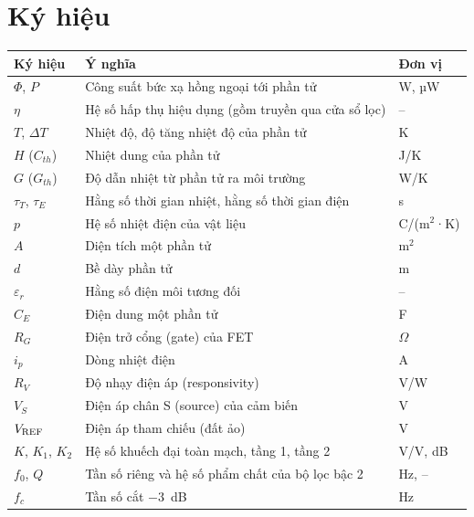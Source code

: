 \section*{Ký hiệu}
\begin{longtable}{@{}p{2.6cm}p{9.6cm}p{2.4cm}@{}}
\toprule
\textbf{Ký hiệu} & \textbf{Ý nghĩa} & \textbf{Đơn vị} \\ \midrule
\endhead
$\Phi$, $P$       & Công suất bức xạ hồng ngoại tới phần tử & W, µW \\
$\eta$            & Hệ số hấp thụ hiệu dụng (gồm truyền qua cửa sổ lọc) & -- \\
$T$, $\Delta T$   & Nhiệt độ, độ tăng nhiệt độ của phần tử & K \\
$H$ ($C_{th}$)    & Nhiệt dung của phần tử & J/K \\
$G$ ($G_{th}$)    & Độ dẫn nhiệt từ phần tử ra môi trường & W/K \\
$\tau_T$, $\tau_E$ & Hằng số thời gian nhiệt, hằng số thời gian điện & s \\
$p$               & Hệ số nhiệt điện của vật liệu & C/(m$^2$·K) \\
$A$               & Diện tích một phần tử & m$^2$ \\
$d$               & Bề dày phần tử & m \\
$\varepsilon_r$   & Hằng số điện môi tương đối & -- \\
$C_E$             & Điện dung một phần tử & F \\
$R_G$             & Điện trở cổng (gate) của FET & $\Omega$ \\
$i_p$             & Dòng nhiệt điện & A \\
$R_V$             & Độ nhạy điện áp (responsivity) & V/W \\
$V_S$             & Điện áp chân S (source) của cảm biến & V \\
$V_\mathrm{REF}$           & Điện áp tham chiếu (đất ảo) & V \\
$K$, $K_1$, $K_2$ & Hệ số khuếch đại toàn mạch, tầng 1, tầng 2 & V/V, dB \\
$f_0$, $Q$        & Tần số riêng và hệ số phẩm chất của bộ lọc bậc 2 & Hz, -- \\
$f_c$             & Tần số cắt $-3$~dB & Hz \\
\bottomrule
\end{longtable}
